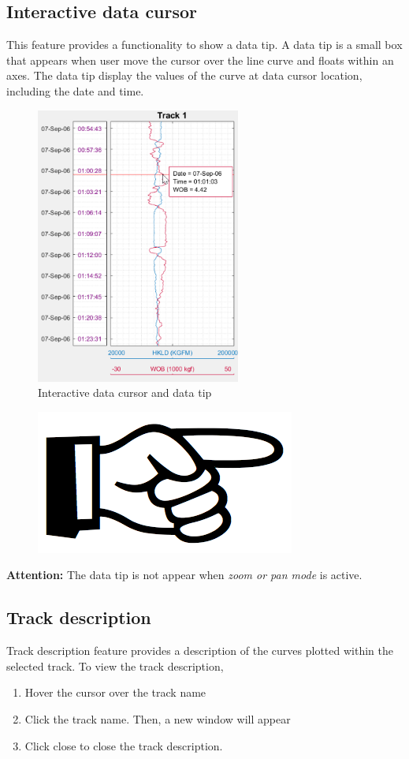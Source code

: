 \documentclass[12pt,a4paper,oneside]{report}
\begin{document}
\subsection{Interactive data cursor}
This feature provides a functionality to show a data tip. A data tip is a small box that appears when user move the cursor over the line curve and floats within an axes. The data tip display the values of the curve at data cursor location, including the date and time.
\begin{figure}[H]
\centering
\includegraphics[width=0.6\textwidth]{fig/cursor.png}
\caption{Interactive data cursor and data tip}
\end{figure}

\begin{figure}
\vspace{-15pt}
\includegraphics[scale=0.08]{fig/hand_point.png}
\end{figure}
\noindent\textbf{Attention:} The data tip is not appear when \emph{zoom or pan mode} is active.

\subsection{Track description}
Track description feature provides a description of the curves plotted within the selected track. To view the track description,
\begin{enumerate}
\setlength\itemsep{0.1em}
\item Hover the cursor over the track name
\item Click the track name. Then, a new window will appear
\item Click close to close the track description.
\end{enumerate}
\end{document}
